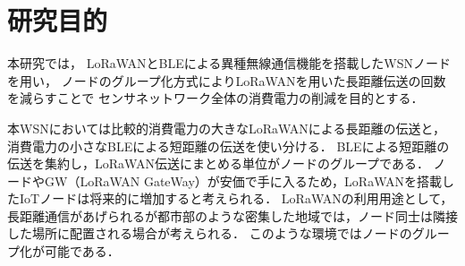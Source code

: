 \section{研究目的}
本研究では，
LoRaWANとBLEによる異種無線通信機能を搭載したWSNノードを用い，
ノードのグループ化方式によりLoRaWANを用いた長距離伝送の回数を減らすことで
センサネットワーク全体の消費電力の削減を目的とする．

本WSNにおいては比較的消費電力の大きなLoRaWANによる長距離の伝送と，
消費電力の小さなBLEによる短距離の伝送を使い分ける．
BLEによる短距離の伝送を集約し，LoRaWAN伝送にまとめる単位がノードのグループである．
ノードやGW（LoRaWAN GateWay）が安価で手に入るため，LoRaWANを搭載したIoTノードは将来的に増加すると考えられる．
LoRaWANの利用用途として，長距離通信があげられるが都市部のような密集した地域では，ノード同士は隣接した場所に配置される場合が考えられる．
このような環境ではノードのグループ化が可能である．

